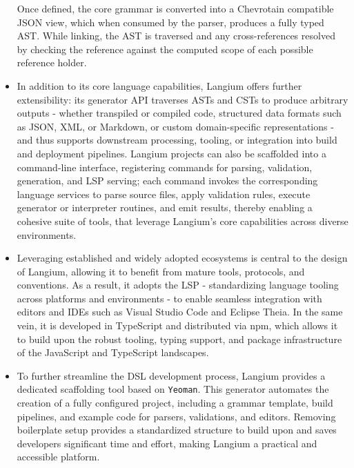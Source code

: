 \begin{multicols}{2}
\begin{itemize}
          Once defined, the core grammar is converted into a Chevrotain compatible JSON view, which when consumed by the parser, produces a fully typed AST. While linking, the AST is traversed and any
          cross-references resolved by checking the reference against the computed scope of each possible reference holder.
    \item In addition to its core language capabilities, Langium offers further extensibility: its generator API traverses ASTs and CSTs to produce arbitrary outputs
          - whether transpiled or compiled code, structured data formats such as JSON, XML, or Markdown, or custom domain-specific representations - and thus supports downstream
          processing, tooling, or integration into build and deployment pipelines.
          Langium projects can also be scaffolded into a command-line interface, registering commands for parsing, validation, generation, and LSP serving; each command invokes the
          corresponding language services to parse source files, apply validation rules, execute generator or interpreter routines, and emit results, thereby enabling a cohesive
          suite of tools, that leverage Langium's core capabilities across diverse environments.
    \item Leveraging established and widely adopted ecosystems is central to the design of Langium, allowing it to benefit from mature tools, protocols, and conventions.
          As a result, it adopts the LSP - standardizing language tooling across platforms and environments - to enable seamless integration with editors and IDEs such as Visual Studio Code and Eclipse Theia.
          In the same vein, it is developed in TypeScript and distributed via npm, which allows it to build upon the robust tooling, typing support, and package infrastructure of the JavaScript and TypeScript landscapes.
    \item To further streamline the DSL development process, Langium provides a dedicated scaffolding tool based on \verb|Yeoman|. This generator automates the creation of a
          fully configured project, including a grammar template, build pipelines, and example code for parsers, validations, and editors. Removing boilerplate setup provides a
          standardized structure to build upon and saves developers significant time and effort, making Langium a practical and accessible platform.
  \end{itemize}
\end{multicols}

